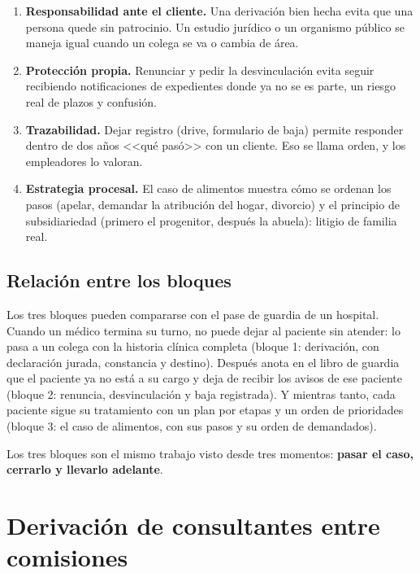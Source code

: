 \documentclass[12pt,oneside]{book}
\begin{document}
\begin{enumerate}
    \item \textbf{Responsabilidad ante el cliente.} Una derivación bien hecha evita que una persona quede sin patrocinio. Un estudio jurídico o un organismo público se maneja igual cuando un colega se va o cambia de área.
    \item \textbf{Protección propia.} Renunciar y pedir la desvinculación evita seguir recibiendo notificaciones de expedientes donde ya no se es parte, un riesgo real de plazos y confusión.
    \item \textbf{Trazabilidad.} Dejar registro (drive, formulario de baja) permite responder dentro de dos años <<qué pasó>> con un cliente. Eso se llama orden, y los empleadores lo valoran.
    \item \textbf{Estrategia procesal.} El caso de alimentos muestra cómo se ordenan los pasos (apelar, demandar la atribución del hogar, divorcio) y el principio de subsidiariedad (primero el progenitor, después la abuela): litigio de familia real.
\end{enumerate}

\section*{Relación entre los bloques}

Los tres bloques pueden compararse con el pase de guardia de un hospital. Cuando un médico termina su turno, no puede dejar al paciente sin atender: lo pasa a un colega con la historia clínica completa (bloque 1: derivación, con declaración jurada, constancia y destino). Después anota en el libro de guardia que el paciente ya no está a su cargo y deja de recibir los avisos de ese paciente (bloque 2: renuncia, desvinculación y baja registrada). Y mientras tanto, cada paciente sigue su tratamiento con un plan por etapas y un orden de prioridades (bloque 3: el caso de alimentos, con sus pasos y su orden de demandados).

Los tres bloques son el mismo trabajo visto desde tres momentos: \textbf{pasar el caso, cerrarlo y llevarlo adelante}.

\chapter[Derivación de consultantes]{Derivación de consultantes entre comisiones}
\end{document}
